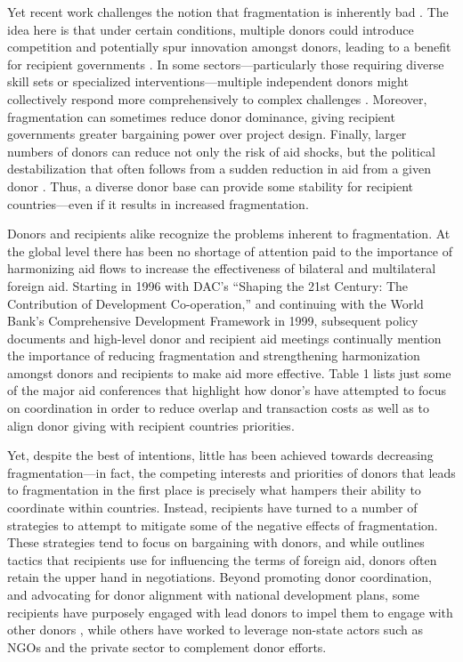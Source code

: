 \documentclass[11pt]{article}
\begin{document}
Yet recent work challenges the notion that fragmentation is inherently bad \citep{han_aid_2015, gehring_aid_2017}. The idea here is that under certain conditions, multiple donors could introduce competition and potentially spur innovation amongst donors, leading to a benefit for recipient governments \citep{han_aid_2015}. In some sectors—particularly those requiring diverse skill sets or specialized interventions—multiple independent donors might collectively respond more comprehensively to complex challenges \citep{gehring_aid_2017, carlitz_harmony_2024}. Moreover, fragmentation can sometimes reduce donor dominance, giving recipient governments greater bargaining power over project design. Finally, larger numbers of donors can reduce not only the risk of aid shocks, but the political destabilization that often follows from a sudden reduction in aid from a given donor \citep{gutting_donor_2017}. Thus, a diverse donor base can provide some stability for recipient countries—even if it results in increased fragmentation.
	
Donors and recipients alike recognize the problems inherent to fragmentation. At the global level there has been no shortage of attention paid to the importance of harmonizing aid flows to increase the effectiveness of bilateral and multilateral foreign aid. Starting in 1996 with DAC’s “Shaping the 21st Century: The Contribution of Development Co-operation,” and continuing with the World Bank’s Comprehensive Development Framework in 1999, subsequent policy documents and high-level donor and recipient aid meetings continually mention the importance of reducing fragmentation and strengthening harmonization amongst donors and recipients to make aid more effective. Table 1 lists just some of the major aid conferences that highlight how donor’s have attempted to focus on coordination in order to reduce overlap and transaction costs as well as to align donor giving with recipient countries priorities. 

Yet, despite the best of intentions, little has been achieved towards decreasing fragmentation—in fact, the competing interests and priorities of donors that leads to fragmentation in the first place is precisely what hampers their ability to coordinate within countries. Instead, recipients have turned to a number of strategies to attempt to mitigate some of the negative effects of fragmentation. These strategies tend to focus on bargaining with donors, and while \cite{swedlund_can_2017} outlines tactics that recipients use for influencing the terms of foreign aid, donors often retain the upper hand in negotiations.  Beyond promoting donor coordination, and advocating for donor alignment with national development plans, some recipients have purposely engaged with lead donors to impel them to engage with other donors \citep{steinwand_compete_2015}, while others have worked to leverage non-state actors such as NGOs and the private sector to complement donor efforts.   
\end{document}
